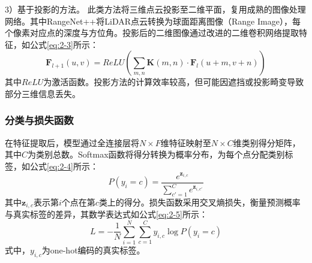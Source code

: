 3）基于投影的方法。
此类方法将三维点云投影至二维平面，复用成熟的图像处理网络。其中RangeNet++将LiDAR点云转换为球面距离图像（Range Image），每个像素对应点的深度与方位角。投影后的二维图像通过改进的二维卷积网络提取特征，如公式\eqref{eq:2-3}所示：
\begin{equation}
    \label{eq:2-3}
    \mathbf{F}_{l+1}(u,v) = ReLU\left(\sum_{m,n} \mathbf{K}(m,n) \cdot \mathbf{F}_l(u+m, v+n)\right)
\end{equation}
其中$ReLU$为激活函数。投影方法的计算效率较高，但可能因遮挡或投影畸变导致部分三维信息丢失。%

\subsubsection{分类与损失函数}
在特征提取后，模型通过全连接层将$N \times F$维特征映射至$N \times C$维类别得分矩阵，其中$C$为类别总数。Softmax函数将得分转换为概率分布，为每个点分配类别标签，如公式\eqref{eq:2-4}所示：
\begin{equation}
    \label{eq:2-4}
    P(y_i=c) = \frac{e^{\mathbf{z}_{i,c}}}{\sum_{c'=1}^C e^{\mathbf{z}_{i,c'}}}
\end{equation}
其中$\mathbf{z}_{i,c}$表示第$i$个点在第$c$类上的得分。损失函数采用交叉熵损失，衡量预测概率与真实标签的差异，其数学表达式如公式\eqref{eq:2-5}所示：
\begin{equation}
    \label{eq:2-5}
    L = -\frac{1}{N} \sum_{i=1}^N \sum_{c=1}^C y_{i,c} \log P(y_i=c)
\end{equation}
式中，$y_{i,c}$为one-hot编码的真实标签。%


